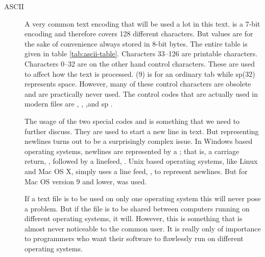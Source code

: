\begin{description}
\item[ASCII] A very common text encoding that will be used a lot in
  this text. \ascii is a \mbox{7-bit} encoding and therefore covers
  128 different characters. But \ascii values are for the sake of
  convenience always stored in 8-bit bytes. The entire \ascii table is
  given in table \ref{tab:ascii-table}\cite{rfc20}. Characters 33--126
  are printable characters. Characters 0--32 are on the other hand
  control characters. These are used to affect how the text is
  processed. \htab(9) is for an ordinary tab while {\acronymstyle
    sp}(32) represents space. However, many of these control
  characters are obsolete and are practically never used. The control
  codes that are actually used in modern files are \nul, \htab,
  \lf,\cret and {\acronymstyle sp} \cite{maini2007digital}.

  The usage of the two special codes \cret and \lf is something that
  we need to further discuss. They are used to start a new line in
  text. But representing newlines turns out to be a surprisingly
  complex issue. In Windows based operating systems, newlines are
  represented by a \crlf; that is, a carriage return, \cret, followed
  by a linefeed, \lf. Unix based operating systems, like Linux and Mac
  OS X, simply uses a line feed, \lf, to represent newlines. But for
  Mac OS version 9 and lower, \cret was
  used\cite{robbins:_common_newline,noria:_under_newlin_oreilly,editor:_end_line_story_rfc,tancig01:_apart_no_more_newline,corporation08:_creat_telep_applic_both_window_linux}.

  If a text file is to be used on only one operating system this will
  never pose a problem. But if the file is to be shared between
  computers running on different operating systems, it will. However,
  this is something that is almost never noticeable to the common
  user. It is really only of importance to programmers who want their
  software to flawlessly run on different operating systems.


\end{description}
